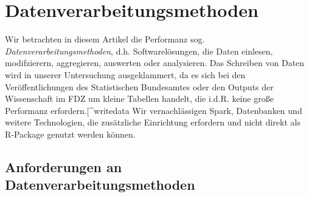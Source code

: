 \documentclass[
  german,
  10pt,
  twoside]{article}
\makeatletter
\newcommand{\berlintime}{%
  \berlinhr=\time\relax
  \divide\berlinhr by 60\relax
  \berlinmin=\time\relax
  \multiply\berlinhr by -60\relax
  \advance\berlinmin by \berlinhr\relax
  \berlinhr=\time\relax
  \divide\berlinhr by 60\relax
  \advance\berlinhr by 1\relax
  \ifnum\berlinhr>23\relax
    \advance\berlinhr by -24\relax
  \fi
  \ifnum\berlinhr<10 0\fi\the\berlinhr:\ifnum\berlinmin<10 0\fi\the\berlinmin%
}
\newif\ifdraftmode
\providecommand{\totalchars}{0}
\providecommand{\totalwords}{0}
\providecommand{\abstractchars}{0}
\providecommand{\abstractwords}{0}
\providecommand{\zusammenfassungchars}{0}
\providecommand{\zusammenfassungwords}{0}
\providecommand{\footnotecountnum}{0}
\providecommand{\citationcountnum}{0}
\providecommand{\authoronechars}{0}
\providecommand{\authortwochars}{0}
\newcommand{\doctitle}{$title$}
\newcommand{\docauthors}{$author-short$}
\newcommand{\docpublication}{$publication$}
\newcommand{\docpublicationissue}{$publication-issue$}
\newcommand{\metadatapage}{%
  \clearpage
  \thispagestyle{empty}
  \onecolumn
  \vspace*{1.5cm}
  
  {\raggedright
  {\LARGE\bfseries\color{wistaBlue} Dokument-Metadaten}\\[0.5cm]
  
  \begin{tabular}{@{}ll}
    \textbf{Titel:} & \doctitle \\[0.3em]
    \textbf{Autoren:} & \docauthors \\[0.3em]
    \textbf{Veröffentlichung:} & \docpublication\ \docpublicationissue \\[0.3em]
    \textbf{Erstellungsdatum:} & \today\ um \berlintime\ Uhr \\[0.3em]
  \end{tabular}
  
  \vspace{0.5cm}
  {\color{wistaBlue}\rule{\textwidth}{1pt}}
  \par}
  
  \vspace{1cm}
  
  {\large\bfseries\color{wistaDarkGray} Dokumentstatistik}\\[0.5cm]
  
  \small
  \begin{tabular}{@{}lrrrrrr@{}}
    \toprule
    \textbf{Abschnitt} & \textbf{Wörter} & \textbf{Zeichen} & \textbf{Fußn.} & \textbf{Quellen} & \textbf{Vorgabe} \\
    \midrule
    Insgesamt & \textcolor{wistaBlue}{\textbf{\totalwords}} & \textcolor{wistaBlue}{\textbf{\totalchars}} & \textcolor{wistaBlue}{\textbf{\footnotecountnum}} & \textcolor{wistaBlue}{\textbf{\citationcountnum}} & 30\,000 Z. \\
    Zusammenfassung & \textcolor{wistaBlue}{\textbf{\zusammenfassungwords}} & \textcolor{wistaBlue}{\textbf{\zusammenfassungchars}} & --- & --- & 800 Z. \\
    Abstract & \textcolor{wistaBlue}{\textbf{\abstractwords}} & \textcolor{wistaBlue}{\textbf{\abstractchars}} & --- & --- & 700 Z. \\
    Autor 1 (O. Hauke) & --- & \textcolor{wistaBlue}{\textbf{\authoronechars}} & --- & --- & 350 Z. \\
    Autor 2 (A. Kristiansen) & --- & \textcolor{wistaBlue}{\textbf{\authortwochars}} & --- & --- & 350 Z. \\
    \midrule
    \sectionrows
    \bottomrule
  \end{tabular}
  \normalsize
  
  \vspace{0.5cm}
  
  {\large\bfseries\color{wistaDarkGray} Schlüsselwörter}\\[0.3cm]
  \small
  \schlusselworterlist
  \normalsize
  
  \vspace{0.5cm}
  
  {\large\bfseries\color{wistaDarkGray} Keywords}\\[0.3cm]
  \small
  \keywordslist
  \normalsize
  
  \vspace{1cm}
  
  {\large\bfseries\color{wistaDarkGray} Tabellen}\\[0.3cm]
  
  \small
  \begin{tabular}{@{}lp{12cm}@{}}
    \toprule
    \textbf{Nr.} & \textbf{Beschreibung} \\
    \midrule
    \tablerows
    \bottomrule
  \end{tabular}
  \normalsize
  
  \vspace{1cm}
  
  {\large\bfseries\color{wistaDarkGray} Abbildungen}\\[0.3cm]
  
  \small
  \begin{tabular}{@{}lp{12cm}@{}}
    \toprule
    \textbf{Nr.} & \textbf{Beschreibung} \\
    \midrule
    \figurerows
    \bottomrule
  \end{tabular}
  \normalsize
  
  \clearpage
}
\makeatother
\begin{document}
\newcommand{\tablerows}{            \hyperref[tbl-pkg-versions]{Tabelle~1} & Versionen verfügbarer R-Packages \\
            \hyperref[tbl-baseline]{Tabelle~2} & Baselines in SAS und Stata (anhand 1\% des simuliertes BTP) \\
            \hyperref[tbl-benchmark-small]{Tabelle~3} & Performanz Messungen für die Fallzahlberechnung anhand 1\% des BTP \\
            \hyperref[tbl-benchmark-regr-small]{Tabelle~4} & Performanz Messungen für die Regressionsberechnung anhand 1\% des BTP \\
            \hyperref[tbl-benchmark]{Tabelle~5} & Performanz Messungen für die Fallzahlberechnung anhand 10\% des BTP \\
            \hyperref[tbl-benchmark-regr]{Tabelle~6} & Performanz Messungen für die Regressionsberechnung anhand 10\% des BTP \\
            \hyperref[tbl-bm-cnt-small]{Tabelle~7} & Benchmarkergebnisse für Fallzahlen (kleine Stichproben des BTP) \\
            \hyperref[tbl-bm-reg-small]{Tabelle~8} & Benchmarkergebnisse für Regression (kleine Stichproben des BTP) \\
}
\newcommand{\figurerows}{            \hyperref[fig-optimization-strategies]{Abbildung~1} & Strategien zur Performanz-Optimierung im FDZ-Bund \\
}
\newcommand{\schlusselworterlist}{}
\newcommand{\keywordslist}{}
\ifdraftmode
\metadatapage
\fi

\section{Datenverarbeitungsmethoden}\label{sec-methoden}

Wir betrachten in diesem Artikel die Performanz sog.
\emph{Datenverarbeitungsmethoden}, d.h. Softwarelösungen, die Daten
einlesen, modifzierern, aggregieren, auswerten oder analysieren. Das
Schreiben von Daten wird in unserer Untersuchung ausgeklammert, da es
sich bei den Veröffentlichungen des Statistischen Bundesamtes oder den
Outputs der Wissenschaft im FDZ um kleine Tabellen handelt, die i.d.R.
keine große Performanz erfordern.{[}\^{}writedata Wir vernachlässigen
Spark, Datenbanken und weitere Technologien, die zusätzliche Einrichtung
erfordern und nicht direkt als R-Package genutzt werden können.

\subsection{Anforderungen an
Datenverarbeitungsmethoden}\label{anforderungen-an-datenverarbeitungsmethoden}
\end{document}
